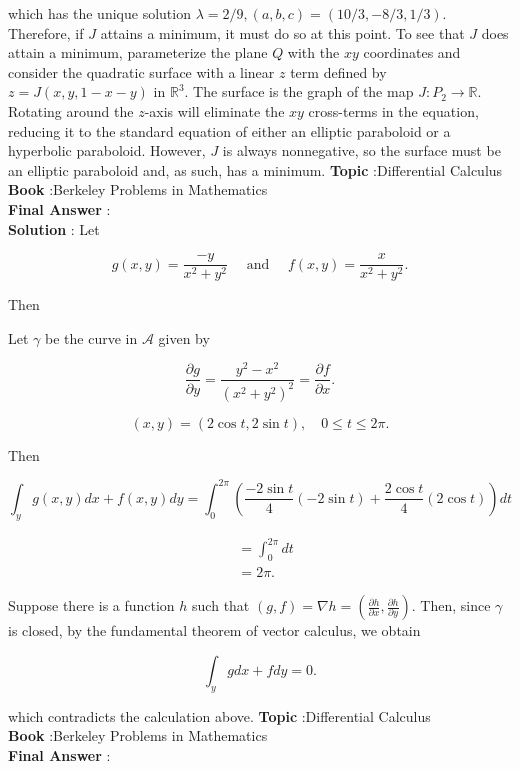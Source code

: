 \documentclass[10pt]{article}
\begin{document}
which has the unique solution $\lambda=2 / 9,(a, b, c)=(10 / 3,-8 / 3,1 / 3)$. Therefore, if $J$ attains a minimum, it must do so at this point. To see that $J$ does attain a minimum, parameterize the plane $Q$ with the $x y$ coordinates and consider the quadratic surface with a linear $z$ term defined by $z=J(x, y, 1-x-y)$ in $\mathbb{R}^{3}$. The surface is the graph of the map $J: P_{2} \rightarrow \mathbb{R}$. Rotating around the $z$-axis will eliminate the $x y$ cross-terms in the equation, reducing it to the standard equation of either an elliptic paraboloid or a hyperbolic paraboloid. However, $J$ is always nonnegative, so the surface must be an elliptic paraboloid and, as such, has a minimum.
\textbf{Topic} :Differential Calculus \\
\textbf{Book} :Berkeley Problems in Mathematics\\
\textbf{Final Answer} :\\


\textbf{Solution} : Let

$$
g(x, y)=\frac{-y}{x^{2}+y^{2}} \quad \text { and } \quad f(x, y)=\frac{x}{x^{2}+y^{2}} .
$$

Then

Let $\gamma$ be the curve in $\mathcal{A}$ given by

$$
\frac{\partial g}{\partial y}=\frac{y^{2}-x^{2}}{\left(x^{2}+y^{2}\right)^{2}}=\frac{\partial f}{\partial x} .
$$

$$
(x, y)=(2 \cos t, 2 \sin t), \quad 0 \leqslant t \leqslant 2 \pi .
$$

Then

$$
\int_{y} g(x, y) d x+f(x, y) d y=\int_{0}^{2 \pi}\left(\frac{-2 \sin t}{4}(-2 \sin t)+\frac{2 \cos t}{4}(2 \cos t)\right) d t
$$



$$
\begin{aligned}
&=\int_{0}^{2 \pi} d t \\
&=2 \pi .
\end{aligned}
$$

Suppose there is a function $h$ such that $(g, f)=\nabla h=\left(\frac{\partial h}{\partial x}, \frac{\partial h}{\partial y}\right)$. Then, since $\gamma$ is closed, by the fundamental theorem of vector calculus, we obtain

$$
\int_{y} g d x+f d y=0 .
$$

which contradicts the calculation above.
\textbf{Topic} :Differential Calculus \\
\textbf{Book} :Berkeley Problems in Mathematics\\
\textbf{Final Answer} :\\
\end{document}

